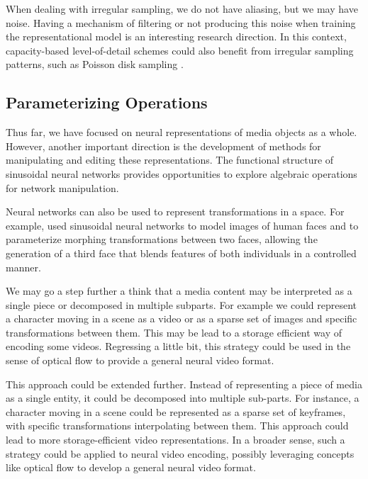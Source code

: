 When dealing with irregular sampling, we do not have aliasing, but we may have noise. Having a mechanism of filtering or not producing this noise when training the representational model is an interesting research direction. In this context, capacity-based level-of-detail schemes could also benefit from irregular sampling patterns, such as Poisson disk sampling \citep{stochastic_cook}.

\subsection{Parameterizing Operations}


Thus far, we have focused on neural representations of media objects as a whole. However, another important direction is the development of methods for manipulating and editing these representations. The functional structure of sinusoidal neural networks provides opportunities to explore algebraic operations for network manipulation.


Neural networks can also be used to represent transformations in a space. For example, \cite{schardong2024neural} used sinusoidal neural networks to model images of human faces and to parameterize morphing transformations between two faces, allowing the generation of a third face that blends features of both individuals in a controlled manner.




We may go a step further a think that a media content may be interpreted as a single piece or decomposed in multiple subparts. For example we could represent a character moving in a scene as a video or as a sparse set of images and specific transformations between them. This may be lead to a storage efficient way of encoding some videos. Regressing a little bit, this strategy could be used in the sense of optical flow \citep{alfarano-opticalflow} to provide a general neural video format.

This approach could be extended further. Instead of representing a piece of media as a single entity, it could be decomposed into multiple sub-parts. For instance, a character moving in a scene could be represented as a sparse set of keyframes, with specific transformations interpolating between them. This approach could lead to more storage-efficient video representations. In a broader sense, such a strategy could be applied to neural video encoding, possibly leveraging concepts like optical flow \citep{alfarano-opticalflow} to develop a general neural video format.


